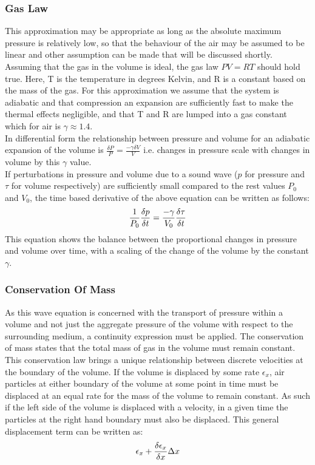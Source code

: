 \subsubsection{Gas Law}
This approximation may be appropriate as long as the absolute maximum pressure is relatively low, so that the behaviour of the air may be assumed to be linear and other assumption can be made that will be discussed shortly.\\
Assuming that the gas in the volume is ideal, the gas law $ PV = RT $ should hold true. Here, T is the temperature in degrees Kelvin, and R is a constant based on the mass of the gas. For this approximation we assume that the system is adiabatic and that compression an expansion are sufficiently fast to make the thermal effects negligible, and that T and R are lumped into a gas constant which for air is $\gamma \approx 1.4$.\\

In differential form the relationship between pressure and volume for an adiabatic expansion of the volume is $\frac{\delta P}{P} = \frac{-\gamma  \delta V}{V} $ i.e. changes in pressure scale with changes in volume by this $\gamma$ value.\\

If perturbations in pressure and volume due to a sound wave ($p$ for pressure and $\tau$ for volume respectively) are sufficiently small compared to the rest values $P_0$ and $V_0$, the time based derivative of the above equation can be written as follows: 
\begin{equation}
\frac{1}{P_0} \frac{\delta p}{\delta t} = \frac{-\gamma}{V_0} \frac{\delta \tau}{\delta t}\\
\end{equation}
This equation shows the balance between the proportional changes in pressure and volume over time, with a scaling of the change of the volume by the constant $\gamma$. \\
\subsubsection{Conservation Of Mass}
As this wave equation is concerned with the transport of pressure within a volume and not just the aggregate pressure of the volume with respect to the surrounding medium, a continuity expression must be applied. The conservation of mass states that the total mass of gas in the volume must remain constant. This conservation law brings a unique relationship between discrete velocities at the boundary of the volume. If the volume is displaced by some rate $\epsilon_x$, air particles at either boundary of the volume at some point in time must be displaced at an equal rate for the mass of the volume to remain constant. As such if the left side of the volume is displaced with a velocity, in a given time the particles at the right hand boundary must also be displaced. This general displacement term can be written as:
\begin{equation}
 \epsilon_x + \frac{\delta \epsilon_x}{\delta x} \Delta x\\
\end{equation}

